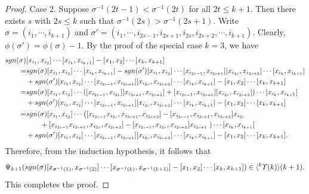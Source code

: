 \documentclass[10pt,a4paper]{amsart}
\def\sgn{{\rm sgn}}
\newcommand{\lr}[1]{\langle #1 \rangle}
\newcommand{\up}[1]{{^{#1}{\it \!\Upsilon}}}
\begin{document}
\begin{proof}
Case 2. Suppose $\sigma^{-1}(2t-1)<\sigma^{-1}(2t)$
for all $2t\leq k+1$. Then there exists $s$ with 
$2s\le k$ such that $\sigma^{-1}(2s)>\sigma^{-1}(2s+1)$.
Write $\sigma=(i_1, \cdots, i_{k+1})$ and 
$\sigma'=(i_1, \cdots, i_{2s-1}, i_{2s+1}, 
i_{2s}, i_{2s+2}, \cdots, i_{k+1})$. 
Clearly, $\phi(\sigma')=\phi(\sigma)-1$.  
By the proof of the special case $k=3$, we have 
\begin{align*}
\sgn(\sigma)&[x_{i_1}, x_{i_2}]\cdots 
[x_{i_k}, x_{i_{k+1}}]-[x_1, x_2]\cdots[x_{k}, x_{k+1}]\\
=&\sgn(\sigma)[x_{i_1}, x_{i_2}]\cdots 
[x_{i_k}, x_{i_{k+1}}]-\sgn(\sigma')[x_{i_1}, x_{i_2}]
\cdots[x_{i_{2s-1}}, x_{i_{2s+1}}][x_{i_{2s}}, x_{i_{2s+2}}]
\cdots [x_{i_k}, x_{i_{k+1}}]\\
&+\sgn(\sigma')[x_{i_1}, x_{i_2}]
\cdots[x_{i_{2s-1}}, x_{i_{2s+1}}][x_{i_{2s}}, x_{i_{2s+2}}]
\cdots [x_{i_k}, x_{i_{k+1}}]-
[x_1, x_2]\cdots[x_{k}, x_{k+1}]\\
=&\sgn(\sigma)[x_{i_1}, x_{i_2}]\cdots 
([x_{i_{2s-1}}, x_{i_{2s}}][x_{i_{2s+1}}, x_{i_{2s+2}}]
+[x_{i_{2s-1}}, x_{i_{2s+1}}][x_{i_{2s}}, x_{i_{2s+2}}])
\cdots [x_{i_k}, x_{i_{k+1}}]\\
&+\sgn(\sigma')[x_{i_1}, x_{i_2}]
\cdots[x_{i_{2s-1}}, x_{i_{2s+1}}][x_{i_{2s}}, x_{i_{2s+2}}]
\cdots [x_{i_k}, x_{i_{k+1}}]-
[x_1, x_2]\cdots[x_{k}, x_{k+1}]\\
=& \sgn(\sigma)[x_{i_1}, x_{i_2}]
\cdots \left([x_{i_{2s-1}}x_{i_{2s}}, x_{i_{2s+1}}, x_{i_{2s+2}}]
-[x_{i_{2s-1}}, x_{i_{2s+1}},x_{i_{2s+2}}]x_{i_{2s}}\right.\\
&\qquad+[x_{i_{2s-1}}x_{i_{2s+1}}, x_{i_{2s}}, x_{i_{2s+2}}]
-[x_{i_{2s-1}}, x_{i_{2s}},x_{i_{2s+2}}]x_{i_{2s+1}}\left. \right)
\cdots[x_{i_k}, x_{i_{k+1}}]\\
&+\sgn(\sigma')[x_{i_1}, x_{i_2}]\cdots[x_{i_{2s-1}}, x_{i_{2s+1}}]
[x_{i_{2s}}, x_{i_{2s+2}}]\cdots [x_{i_k}, x_{i_{k+1}}]-
[x_1, x_2]\cdots[x_{k}, x_{k+1}].
\end{align*}
Therefore, from the induction hypothesis, it follows that 
\[\Psi_{k+1}(\sgn(\sigma)[x_{\sigma^{-1}(1)}, x_{\sigma^{-1}(2)}]
\cdots [x_{\sigma^{-1}(k)}, x_{\sigma^{-1}(k+1)}]-[x_1, x_2]
\cdots[x_{k}, x_{k+1}])\in \lr{\up{k}(k)}(k+1).\]
This completes the proof.
\end{proof}
\end{document}
